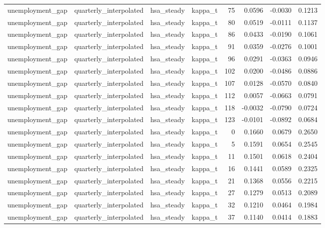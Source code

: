 \begin{tabular}{llllrrrr}
unemployment\_gap & quarterly\_interpolated & hsa\_steady & kappa\_t & 75 & 0.0596 & -0.0030 & 0.1213 \\
unemployment\_gap & quarterly\_interpolated & hsa\_steady & kappa\_t & 80 & 0.0519 & -0.0111 & 0.1137 \\
unemployment\_gap & quarterly\_interpolated & hsa\_steady & kappa\_t & 86 & 0.0433 & -0.0190 & 0.1061 \\
unemployment\_gap & quarterly\_interpolated & hsa\_steady & kappa\_t & 91 & 0.0359 & -0.0276 & 0.1001 \\
unemployment\_gap & quarterly\_interpolated & hsa\_steady & kappa\_t & 96 & 0.0291 & -0.0363 & 0.0946 \\
unemployment\_gap & quarterly\_interpolated & hsa\_steady & kappa\_t & 102 & 0.0200 & -0.0486 & 0.0886 \\
unemployment\_gap & quarterly\_interpolated & hsa\_steady & kappa\_t & 107 & 0.0128 & -0.0570 & 0.0840 \\
unemployment\_gap & quarterly\_interpolated & hsa\_steady & kappa\_t & 112 & 0.0057 & -0.0663 & 0.0791 \\
unemployment\_gap & quarterly\_interpolated & hsa\_steady & kappa\_t & 118 & -0.0032 & -0.0790 & 0.0724 \\
unemployment\_gap & quarterly\_interpolated & hsa\_steady & kappa\_t & 123 & -0.0101 & -0.0892 & 0.0684 \\
unemployment\_gap & quarterly\_interpolated & hsa\_steady & kappa\_t & 0 & 0.1660 & 0.0679 & 0.2650 \\
unemployment\_gap & quarterly\_interpolated & hsa\_steady & kappa\_t & 5 & 0.1591 & 0.0654 & 0.2545 \\
unemployment\_gap & quarterly\_interpolated & hsa\_steady & kappa\_t & 11 & 0.1501 & 0.0618 & 0.2404 \\
unemployment\_gap & quarterly\_interpolated & hsa\_steady & kappa\_t & 16 & 0.1441 & 0.0589 & 0.2325 \\
unemployment\_gap & quarterly\_interpolated & hsa\_steady & kappa\_t & 21 & 0.1368 & 0.0556 & 0.2215 \\
unemployment\_gap & quarterly\_interpolated & hsa\_steady & kappa\_t & 27 & 0.1279 & 0.0513 & 0.2089 \\
unemployment\_gap & quarterly\_interpolated & hsa\_steady & kappa\_t & 32 & 0.1210 & 0.0464 & 0.1984 \\
unemployment\_gap & quarterly\_interpolated & hsa\_steady & kappa\_t & 37 & 0.1140 & 0.0414 & 0.1883 \\

\end{tabular}
